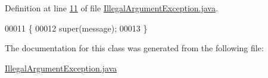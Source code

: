 Definition at line \hyperlink{IllegalArgumentException_8java_source_l00011}{11} of file \hyperlink{IllegalArgumentException_8java_source}{Illegal\-Argument\-Exception.\-java}.


\begin{DoxyCode}
00011                                                    \{
00012         super(message);
00013     \}
\end{DoxyCode}


The documentation for this class was generated from the following file\-:\begin{DoxyCompactItemize}
\item 
\hyperlink{IllegalArgumentException_8java}{Illegal\-Argument\-Exception.\-java}\end{DoxyCompactItemize}

